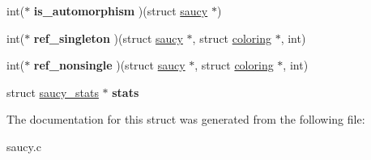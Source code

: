 \begin{DoxyCompactItemize}
\item 
\hypertarget{structsaucy_a70c592b2d42e48246ee1b81b5dde9250}{int($\ast$ {\bfseries is\-\_\-automorphism} )(struct \hyperlink{structsaucy}{saucy} $\ast$)}\label{structsaucy_a70c592b2d42e48246ee1b81b5dde9250}

\item 
\hypertarget{structsaucy_aebd7e4479e6757ba8c63bf09813838b5}{int($\ast$ {\bfseries ref\-\_\-singleton} )(struct \hyperlink{structsaucy}{saucy} $\ast$, struct \hyperlink{structcoloring}{coloring} $\ast$, int)}\label{structsaucy_aebd7e4479e6757ba8c63bf09813838b5}

\item 
\hypertarget{structsaucy_a104924cb7e33331b40451bbdd6f9f151}{int($\ast$ {\bfseries ref\-\_\-nonsingle} )(struct \hyperlink{structsaucy}{saucy} $\ast$, struct \hyperlink{structcoloring}{coloring} $\ast$, int)}\label{structsaucy_a104924cb7e33331b40451bbdd6f9f151}

\item 
\hypertarget{structsaucy_a3a8e6e9aa0f769b28a1a646937a077e0}{struct \hyperlink{structsaucy__stats}{saucy\-\_\-stats} $\ast$ {\bfseries stats}}\label{structsaucy_a3a8e6e9aa0f769b28a1a646937a077e0}

\end{DoxyCompactItemize}


The documentation for this struct was generated from the following file\-:\begin{DoxyCompactItemize}
\item 
saucy.\-c\end{DoxyCompactItemize}
